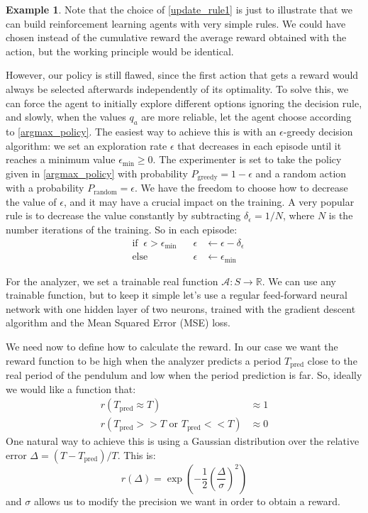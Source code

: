 \documentclass[11pt,a4paper,twoside]{report}
\newcommand{\+}{\textnormal{+} }
\theoremstyle{definition}
\newtheorem{myex}[mythm]{Example}
\numberwithin{equation}{chapter}
\begin{document}
\begin{myex}
Note that the choice of \eqref{update_rule1} is just to illustrate that we can
build reinforcement learning agents with very simple rules. We could have
chosen instead of the cumulative reward the average reward obtained with the 
action, but the working principle would be identical.

However, our policy is still flawed, since the first action that gets a reward
would always be selected afterwards independently of its optimality. To solve
this, we can force the agent to initially explore different options ignoring the
decision rule, and slowly, when the values $q_a$ are more reliable, let the
agent choose according to \eqref{argmax_policy}. The easiest way to achieve this
is with an $\epsilon$-greedy decision algorithm: we set an exploration rate
$\epsilon$ that decreases in each episode until it reaches a minimum value
$\epsilon_\text{min}\geq 0$. The experimenter is set to take the policy given in
\eqref{argmax_policy} with probability $P_{\text{greedy}}=1-\epsilon$ and a
random action with a probability $P_{\text{random}}=\epsilon$. We have the
freedom to choose how to decrease the value of $\epsilon$, and it may have a
crucial impact on the training. A very popular rule is to decrease the value
constantly by subtracting $\delta_\epsilon = 1/N$, where $N$ is the number
iterations of the training. So in each episode:
\begin{align}
  &\text{if}\; \; \epsilon > \epsilon_\text{min} \;\;\; &\epsilon&\leftarrow\epsilon - \delta_\epsilon \\
  &\text{else} \; \;  &\epsilon &\leftarrow \epsilon_\text{min}
\end{align} 


For the analyzer, we set a trainable real function $\mathscr{A}: S \rightarrow
\mathbb{R}$. We can use any trainable function, but to keep it simple let's use
a regular feed-forward neural network with one hidden layer of two neurons,
trained with the gradient descent algorithm and the Mean
Squared Error (MSE) loss.

We need now to define how to calculate the reward.  In our case we want the
reward function to be high when the analyzer predicts a period $T_\text{pred}$
close to the real period of the pendulum and low when the period prediction is
far. So, ideally we would like a function that:
\begin{align}
       r(T_{\text{pred}} \approx T) &\approx 1\\
       r(T_{\text{pred}}>> T \text{ or } T_{\text{pred}} << T) & \approx 0
\end{align}
One natural way to achieve this is using a Gaussian distribution over the
relative error $\Delta=(T-T_{\text{pred}})/T$. This is:
\begin{equation}
   r(\Delta)=\exp\left(-\frac{1}{2}\left( \frac{\Delta}{\sigma} \right) ^2\right)
  \label{gaussian_reward}
\end{equation}
and $\sigma$ allows us to modify the precision we want in order to obtain a 
reward.


\end{myex}
\end{document}
